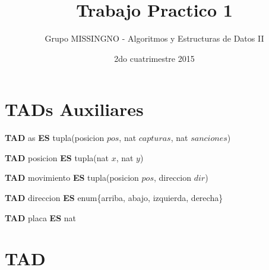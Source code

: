 \documentclass[10pt, a4paper]{article}
\author{Grupo MISSINGNO - Algoritmos y Estructuras de Datos II}
\date{2do cuatrimestre 2015}
\title{Trabajo Practico 1}
\begin{document}


\thispagestyle{empty}

\maketitle
\tableofcontents

\newpage

\section{TADs Auxiliares}
\par \textbf{TAD} as \textbf{ES} tupla(posicion $pos$, nat $capturas$, nat $sanciones$)
\par \textbf{TAD} posicion \textbf{ES} tupla(nat $x$, nat $y$)
\par \textbf{TAD} movimiento \textbf{ES} tupla(posicion $pos$, direccion $dir$)
\par \textbf{TAD} direccion \textbf{ES} enum\{arriba, abajo, izquierda, derecha\}
\par \textbf{TAD} placa \textbf{ES} nat

\section{TAD }
\end{document}
